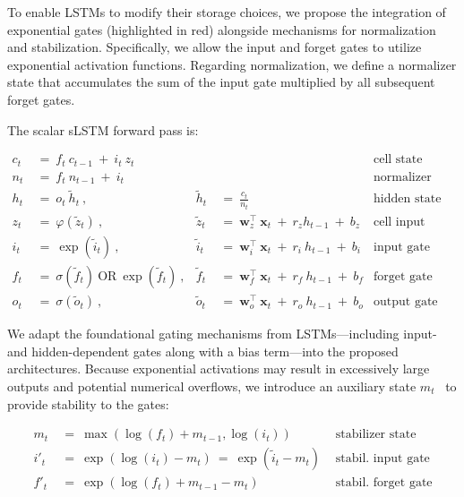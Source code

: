 To enable LSTMs to modify their storage choices, we propose the integration of exponential gates (highlighted in red) alongside mechanisms for normalization and stabilization. Specifically, we allow the input and forget gates to utilize exponential activation functions. Regarding normalization, we define a normalizer state that accumulates the sum of the input gate multiplied by all subsequent forget gates.

The scalar sLSTM forward pass is:

\begin{align}
\label{eq:slstmforward}
c_t \ &= \  f_t \ c_{t-1} \ + \ i_t \ z_t & & 
 &\text{cell state} \\
n_t \ &= \  f_t \ n_{t-1} \ + \ i_t  & & 
 &\text{normalizer state} \\
h_t \ &= \ o_t \ \tilde{h}_t \ ,
  &\tilde{h}_t \ &= \ \frac{c_t}{n_t}
&\text{hidden state} \\
z_t \ &= \ \varphi \left( \tilde{z}_t \right) \ , 
  &\tilde{z}_t \ &=  \ \mathbf{w}^\top_{z} \ \mathbf{x}_t \ + \
  r_{z}  h_{t-1} \ + \  b_{z}
  &\text{cell input} \\
i_t \ &= \ \!\exp \left( \tilde{i}_t  \right) \ , 
  &\tilde{i}_t \ &= \ \mathbf{w}^\top_{i} \ \mathbf{x}_t \ + \
  r_{i}  \ h_{t-1} \ + \  b_{i}
  &\text{input gate} \\
f_t \ &= \ \sigma \left(  \tilde{f}_t \right) \ \text{OR} \
\!\exp \left(  \tilde{f}_t \right) \ ,
  &\tilde{f}_t \ &= \ \mathbf{w}^\top_{f} \ \mathbf{x}_t  \ + \
  r_{f}  \ h_{t-1} \ + \  b_{f}
  &\text{forget gate} \\
o_t \ &= \ \sigma \left( \tilde{o}_t \right) \ , 
  &\tilde{o}_t  \ &= \ \mathbf{w}^\top_{o} \ \mathbf{x}_t \ + \
  r_{o}  \ h_{t-1} \ + \  b_{o}
  &\text{output gate} 
\end{align}

We adapt the foundational gating mechanisms from LSTMs—including input- and hidden-dependent gates along with a bias term—into the proposed architectures. Because exponential activations may result in excessively large outputs and potential numerical overflows, we introduce an auxiliary state \mbox{$m_t$~\citep{Milakov:18arxiv}} to provide stability to the gates:

\begin{align}
\label{eq:slstmstabil}
m_t \ &= \ \max \left( \log ( f_t ) + m_{t-1} , \log ( i_t ) \right) &\text{stabilizer state} \\
i'_t \ &= \ \!\exp \left( \log \left ( i_t \right) - m_t \right) \ = \ \!\exp \left( \tilde{i}_t - m_t \right) \ \, 
  &\text{stabil. input gate} \\
f'_t \ &= \ \!\exp \left( \log \left( f_t \right) + m_{t-1} - m_t \right) \ \, 
  &\text{stabil. forget gate}
\end{align}

